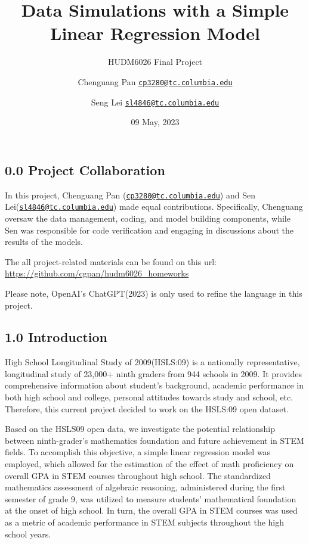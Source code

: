 \documentclass[
]{article}
\title{Data Simulations with a Simple Linear Regression Model}
\subtitle{HUDM6026 Final Project}
\author{Chenguang Pan
\href{mailto:cp3280@tc.columbia.edu}{\nolinkurl{cp3280@tc.columbia.edu}} \and Seng
Lei
\href{mailto:sl4846@tc.columbia.edu}{\nolinkurl{sl4846@tc.columbia.edu}}}
\date{09 May, 2023}
\begin{document}
\maketitle

\newpage

\setcounter{tocdepth}{4}
\tableofcontents

\newpage

\hypertarget{project-collaboration}{%
\subsection{0.0 Project Collaboration}\label{project-collaboration}}

In this project, Chenguang Pan
(\href{mailto:cp3280@tc.columbia.edu}{\nolinkurl{cp3280@tc.columbia.edu}})
and Sen
Lei(\href{mailto:sl4846@tc.columbia.edu}{\nolinkurl{sl4846@tc.columbia.edu}})
made equal contributions. Specifically, Chenguang oversaw the data
management, coding, and model building components, while Sen was
responsible for code verification and engaging in discussions about the
results of the models.

The all project-related materials can be found on this url:
\url{https://github.com/cgpan/hudm6026_homeworks}

Please note, OpenAI's ChatGPT(2023) is only used to refine the language
in this project.

\hypertarget{introduction}{%
\subsection{1.0 Introduction}\label{introduction}}

High School Longitudinal Study of 2009(HSLS:09) is a nationally
representative, longitudinal study of 23,000+ ninth graders from 944
schools in 2009. It provides comprehensive information about student's
background, academic performance in both high school and college,
personal attitudes towards study and school, etc. Therefore, this
current project decided to work on the HSLS:09 open dataset.

Based on the HSLS09 open data, we investigate the potential relationship
between ninth-grader's mathematics foundation and future achievement in
STEM fields. To accomplish this objective, a simple linear regression
model was employed, which allowed for the estimation of the effect of
math proficiency on overall GPA in STEM courses throughout high school.
The standardized mathematics assessment of algebraic reasoning,
administered during the first semester of grade 9, was utilized to
measure students' mathematical foundation at the onset of high school.
In turn, the overall GPA in STEM courses was used as a metric of
academic performance in STEM subjects throughout the high school years.
\end{document}
